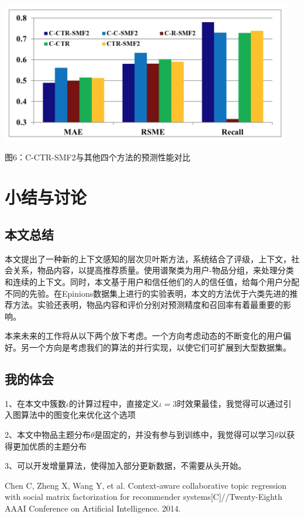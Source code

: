\documentclass[10pt,a4paper]{article}
\theoremstyle{mythm}%
\numberwithin{equation}{section}
\begin{document}
\includegraphics[width=5in]{figure6.png} 

图6：C-CTR-SMF2与其他四个方法的预测性能对比
\section{小结与讨论}
\subsection{本文总结}
本文提出了一种新的上下文感知的层次贝叶斯方法，系统结合了评级，上下文，社会关系，物品内容，以提高推荐质量。使用谱聚类为用户-物品分组，来处理分类和连续的上下文。同时，本文基于用户和信任他们的人的信任值，给每个用户分配不同的先验。在Epinions数据集上进行的实验表明，本文的方法优于六类先进的推荐方法。实验还表明，物品内容和评价分别对预测精度和召回率有着最重要的影响。

本来未来的工作将从以下两个放下考虑。一个方向考虑动态的不断变化的用户偏好。另一个方向是考虑我们的算法的并行实现，以使它们可扩展到大型数据集。
\subsection{我的体会}
1、在本文中簇数$\iota$的计算过程中，直接定义$\iota=3$时效果最佳，我觉得可以通过引入图算法中的图变化来优化这个选项

2、本文中物品主题分布$\theta$是固定的，并没有参与到训练中，我觉得可以学习$\theta$以获得更加优质的主题分布

3、可以开发增量算法，使得加入部分更新数据，不需要从头开始。

\begin{thebibliography}{MM}
\addtolength{\itemsep}{-0.5em}
\begin{small}
Chen C, Zheng X, Wang Y, et al. Context-aware collaborative topic regression with social matrix factorization for recommender systems[C]//Twenty-Eighth AAAI Conference on Artificial Intelligence. 2014.
\end{small}
\end{thebibliography}
\newpage
\end{document}
